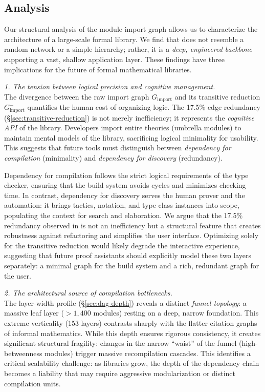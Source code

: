 \subsection{Analysis}
\label{sec:module_conclusion}
Our structural analysis of the  module import graph allows us to characterize the architecture of a large-scale formal library. We find that  does not resemble a random network or a simple hierarchy; rather, it is a \textit{deep, engineered backbone} supporting a vast, shallow application layer. These findings have three implications for the future of formal mathematical libraries.

\medskip
\noindent \textit{1. The tension between logical precision and cognitive management.} \\
The divergence between the raw import graph $G_{\mathrm{import}}$ and its transitive reduction $G_{\mathrm{import}}^{-}$ quantifies the human cost of organizing logic. The 17.5\% edge redundancy (\S\ref{sec:transitive-reduction}) is not merely inefficiency; it represents the \textit{cognitive API} of the library. Developers import entire theories (umbrella modules) to maintain mental models of the library, sacrificing logical minimality for usability. This suggests that future tools must distinguish between \textit{dependency for compilation} (minimality) and \textit{dependency for discovery} (redundancy).

Dependency for compilation follows the strict logical requirements of the type checker, ensuring that the build system avoids cycles and minimizes checking time. In contrast, dependency for discovery serves the human prover and the automation: it brings tactics, notation, and type class instances into scope, populating the context for search and elaboration. We argue that the 17.5\% redundancy observed in  is not an inefficiency but a structural feature that creates robustness against refactoring and simplifies the user interface. Optimizing solely for the transitive reduction would likely degrade the interactive experience, suggesting that future proof assistants should explicitly model these two layers separately: a minimal graph for the build system and a rich, redundant graph for the user.

\medskip
\noindent \textit{2. The architectural source of compilation bottlenecks.} \\
The layer-width profile (\S\ref{sec:dag-depth}) reveals a distinct \textit{funnel topology}: a massive leaf layer ($>1,400$ modules) resting on a deep, narrow foundation. This extreme verticality (153 layers) contrasts sharply with the flatter citation graphs of informal mathematics. While this depth ensures rigorous consistency, it creates significant structural fragility: changes in the narrow ``waist'' of the funnel (high-betweenness modules) trigger massive recompilation cascades. This identifies a critical scalability challenge: as libraries grow, the depth of the dependency chain becomes a liability that may require aggressive modularization or distinct compilation units.

